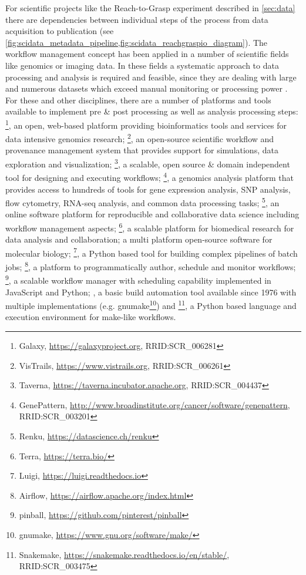 For scientific projects like the Reach-to-Grasp experiment described in \cref{sec:data} there are dependencies between individual steps of the process from data acquisition to publication (see \cref{fig:scidata_metadata_pipeline,fig:scidata_reachgraspio_diagram}). The workflow management concept has been applied in a number of scientific fields like genomics or imaging data. In these fields a systematic approach to data processing and analysis is required and feasible, since they are dealing with large and numerous datasets which exceed manual monitoring or processing power \citep[e.g.][]{Palm_2010}.
For these and other disciplines, there are a number of platforms and tools available to implement pre \& post processing as well as analysis processing steps: \footnote{Galaxy, \url{https://galaxyproject.org}, RRID:SCR\_006281}, an  open, web-based platform providing bioinformatics tools and services for data intensive genomics research; \footnote{VisTrails, \url{https://www.vistrails.org}, RRID:SCR\_006261}, an open-source scientific workflow and provenance management system that provides support for simulations, data exploration and visualization; \footnote{Taverna, \url{https://taverna.incubator.apache.org}, RRID:SCR\_004437}, a scalable, open source \& domain independent tool for designing and executing workflows;  \footnote{GenePattern, \url{http://www.broadinstitute.org/cancer/software/genepattern}, RRID:SCR\_003201}, a genomics analysis platform that provides access to hundreds of tools for gene expression analysis, SNP analysis, flow cytometry, RNA-seq analysis, and common data processing tasks; \footnote{Renku, \url{https://datascience.ch/renku}}, an online software platform for reproducible and collaborative data science including workflow management aspects; \footnote{Terra, \url{https://terra.bio/}}, a scalable platform  for biomedical research for data analysis and collaboration;  \citep{Okonechnikov_2012} a multi platform open-source software for molecular biology; \footnote{Luigi, \url{https://luigi.readthedocs.io}}, a Python based tool for building complex pipelines of batch jobs;  \footnote{Airflow, \url{https://airflow.apache.org/index.html}}, a platform to  programmatically author, schedule and monitor workflows; \footnote{pinball, \url{https://github.com/pinterest/pinball}}, a scalable workflow manager with scheduling capability implemented in JavaScript and Python; , a basic build automation tool available since 1976 with multiple implementations (e.g. gnumake\footnote{gnumake, \url{https://www.gnu.org/software/make/}}) and \footnote{Snakemake, \url{https://snakemake.readthedocs.io/en/stable/}, RRID:SCR\_003475}, a Python based language and execution environment for make-like workflows. 

